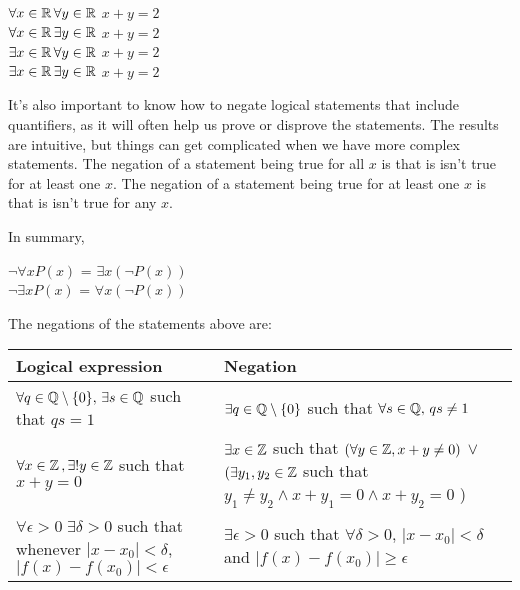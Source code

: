 \documentclass{article}
\begin{document}
\begin{center}

$\forall x \in {\mathbb{R}} \, \forall y \in {\mathbb{R}}$  $x + y = 2$ \\
$\forall x \in {\mathbb{R}} \, \exists y \in {\mathbb{R}}$  $x + y = 2$ \\
$\exists x \in {\mathbb{R}} \, \forall y \in {\mathbb{R}}$  $x + y = 2$ \\
$\exists x \in {\mathbb{R}} \, \exists y \in {\mathbb{R}}$ $x + y = 2$ 
\end{center}
\vspace{1em}

It's also important to know how to negate logical statements that include quantifiers, as it will often help us prove or disprove the statements. The results are intuitive, but things can get complicated when we have more complex statements. The negation of a statement being true for all $x$ is that is isn't true for at least one $x$. The negation of a statement being true for at least one $x$ is that is isn't true for any $x$. 

In summary,

\begin{center}
    $\neg \forall x P(x)$ = $\exists  x (\neg P(x))$ \\
$\neg \exists x P(x)$ = $\forall x (\neg P(x))$
\end{center}

\vspace{1em}

The negations of the statements above are:
\vspace{1em}

\begin{tabular}{p{} p{}}
     Logical expression & Negation \\
     \hline
     $\forall q \in {\mathbb{Q}} \setminus \{0\}, \, \exists s \in {\mathbb{Q}}$ such that $qs=1$ & $\exists q \in {\mathbb{Q}} \setminus \{0\}$ such that  $\forall s \in {\mathbb{Q}}, \, qs \neq 1$\\
     $\forall x \in {\mathbb{Z}} \, , \exists ! y \in {\mathbb{Z}}$ such that $x+y = 0$ & $\exists x \in {\mathbb{Z}}$ such  that $(\forall y \in {\mathbb{Z}}, x+y \neq 0)$ $\vee$ $(\exists y_1, y_2 \in {\mathbb{Z}}$ such that $y_1 \neq y_2 \wedge x+y_1 = 0 \wedge x+y_2 = 0$  ) \\
     $\forall \epsilon >0 \; \exists \delta > 0$ such that whenever $|x - x_0| < \delta$, $|f(x)-f(x_0)| < \epsilon$ & $\exists \epsilon >0$ such that $\forall \delta > 0$,  $|x - x_0| < \delta$ and  $|f(x)-f(x_0)| \geq \epsilon$
\end{tabular}
\end{document}
